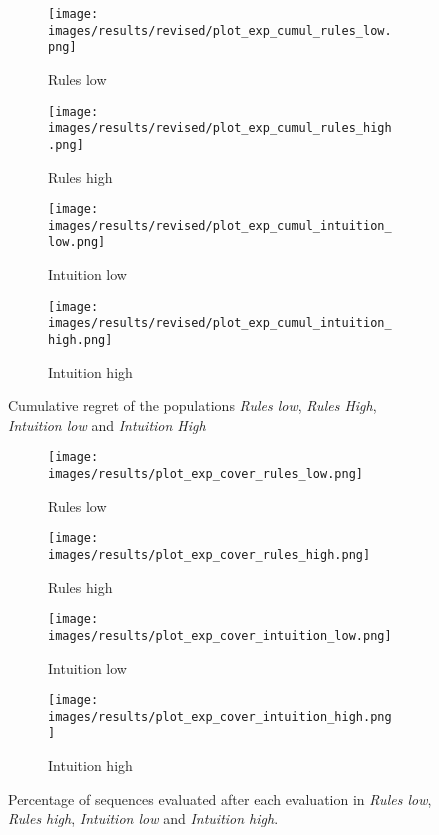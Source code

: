 \begin{figure}[ht]
	\begin{subfigure}{0.49\linewidth}
	\centering
	\texttt{[image: images/results/revised/plot\_exp\_cumul\_rules\_low.png]}
	\caption{Rules low}
	\label{fig:exp_cumul_rules_low}
	\end{subfigure}
	\hfill
	\begin{subfigure}{0.49\linewidth}
	\centering
	\texttt{[image: images/results/revised/plot\_exp\_cumul\_rules\_high.png]}
	\caption{Rules high}
	\label{fig:exp_cumul_rules_high}
	\end{subfigure}
	\begin{subfigure}{0.49\linewidth}
	\centering
	\texttt{[image: images/results/revised/plot\_exp\_cumul\_intuition\_low.png]}
	\caption{Intuition low}
	\label{fig:exp_cumul_intuition_low}
	\end{subfigure}
	\hfill
	\begin{subfigure}{0.49\linewidth}
	\centering
	\texttt{[image: images/results/revised/plot\_exp\_cumul\_intuition\_high.png]}
	\caption{Intuition high}
	\label{fig:exp_cumul_intuition_high}
	\end{subfigure}
	\caption[Cumulative regret in Rules and Intuition]{Cumulative regret of the populations \emph{Rules low}, \emph{Rules
	High}, \emph{Intuition low} and \emph{Intuition High}}
	\label{fig:exp_cumul1}
\end{figure}

\begin{figure}[ht]
	\begin{subfigure}{0.49\linewidth}
	\centering
	\texttt{[image: images/results/plot\_exp\_cover\_rules\_low.png]}
	\caption{Rules low}
	\label{fig:exp_cover_rules_low}
	\end{subfigure}
	\hfill
	\begin{subfigure}{0.49\linewidth}
	\centering
	\texttt{[image: images/results/plot\_exp\_cover\_rules\_high.png]}
	\caption{Rules high}
	\label{fig:exp_cover_rules_high}
	\end{subfigure}
	\begin{subfigure}{0.49\linewidth}
	\centering
	\texttt{[image: images/results/plot\_exp\_cover\_intuition\_low.png]}
	\caption{Intuition low}
	\label{fig:exp_cover_intuition_low}
	\end{subfigure}
	\hfill
	\begin{subfigure}{0.49\linewidth}
	\centering
	\texttt{[image: images/results/plot\_exp\_cover\_intuition\_high.png]}
	\caption{Intuition high}
	\label{fig:exp_cover_intuition_high}
	\end{subfigure}
	\caption[Percentage of sequences evaluated in Rules and Intuition]{Percentage of sequences evaluated after each evaluation in \emph{Rules
	low}, \emph{Rules high}, \emph{Intuition low} and \emph{Intuition high}.}
	\label{fig:exp_cover1}
\end{figure}

